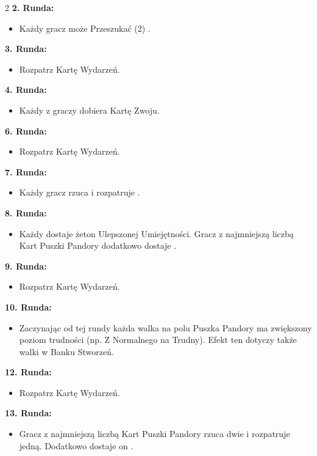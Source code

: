 \begin{multicols*}{2}
\textbf{2. Runda:}
\begin{itemize}
  \item Każdy gracz może Przeszukać (2) .
\end{itemize}

\textbf{3. Runda:}
\begin{itemize}
  \item Rozpatrz Kartę Wydarzeń.
\end{itemize}

\textbf{4. Runda:}
\begin{itemize}
  \item Każdy z graczy dobiera Kartę Zwoju.
\end{itemize}

\textbf{6. Runda:}
\begin{itemize}
  \item Rozpatrz Kartę Wydarzeń.
\end{itemize}

\textbf{7. Runda:}
\begin{itemize}
  \item Każdy gracz rzuca i rozpatruje .
\end{itemize}

\textbf{8. Runda:}
\begin{itemize}
  \item Każdy dostaje żeton Ulepszonej Umiejętności. Gracz z najmniejszą liczbą Kart Puszki Pandory dodatkowo dostaje .
\end{itemize}

\textbf{9. Runda:}
\begin{itemize}
  \item Rozpatrz Kartę Wydarzeń.
\end{itemize}

\textbf{10. Runda:}
\begin{itemize}
  \item Zaczynając od tej rundy każda walka na polu Puszka Pandory ma zwiększony poziom trudności (np. Z Normalnego na Trudny). Efekt ten dotyczy także walki w Banku Stworzeń.
\end{itemize}

\textbf{12. Runda:}
\begin{itemize}
  \item Rozpatrz Kartę Wydarzeń.
\end{itemize}

\textbf{13. Runda:}
\begin{itemize}
  \item Gracz z najmniejszą liczbą Kart Puszki Pandory rzuca dwie  i rozpatruje jedną. Dodatkowo dostaje on .
\end{itemize}


\end{multicols*}
